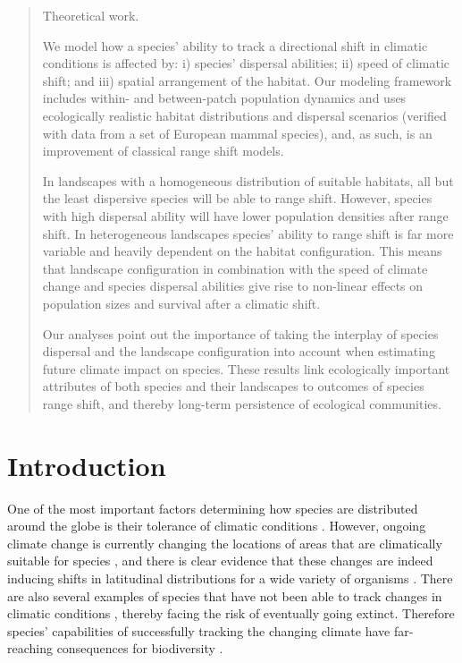 \documentclass[12pt,pdftex]{article}
\begin{document}
\begin{spacing}{2}
\begin{abstract}
Theoretical work. 

  We model how a species' ability to track a directional shift in climatic conditions is affected by: i) species' dispersal abilities; ii) speed of climatic shift; and iii) spatial arrangement of the habitat. Our modeling framework includes within- and between-patch population dynamics and uses ecologically realistic habitat distributions and dispersal scenarios (verified with data from a set of  European mammal species), and, as such, is an improvement of classical range shift models. 

  In landscapes with a homogeneous distribution of suitable habitats, all but the least dispersive species will be able to range shift. However, species with high dispersal ability will have lower population densities after range shift. In heterogeneous landscapes species' ability to range shift is far more variable and heavily dependent on the habitat configuration. This means that landscape configuration in combination with the speed of climate change and species dispersal abilities give rise to non-linear effects on population sizes and survival after a climatic shift.

  Our analyses point out the importance of taking the interplay of species dispersal and the landscape configuration into account when estimating future climate impact on species. These results link ecologically important attributes of both species and their landscapes to outcomes of species range shift, and thereby long-term persistence of ecological communities. 
\end{abstract}
\clearpage

\section*{Introduction}
One of the most important factors determining how species are distributed around the globe is their tolerance of climatic conditions \citep{Thomas2010}. However, ongoing climate change is currently changing the locations of areas that are climatically suitable for species \citep{Loarie2009}, and there is clear evidence that these changes are indeed inducing shifts in latitudinal distributions for a wide variety of organisms \citep{Parmesan2003, Chen2011,Lenoir2015}. There are also several examples of species that have not been able to track changes in climatic conditions \citep{Maclean2011}, thereby facing the risk of eventually going extinct. Therefore species' capabilities of successfully tracking the changing climate have far-reaching consequences for biodiversity \citep{Thuiller2005a}. 


\end{spacing}
\end{document}
